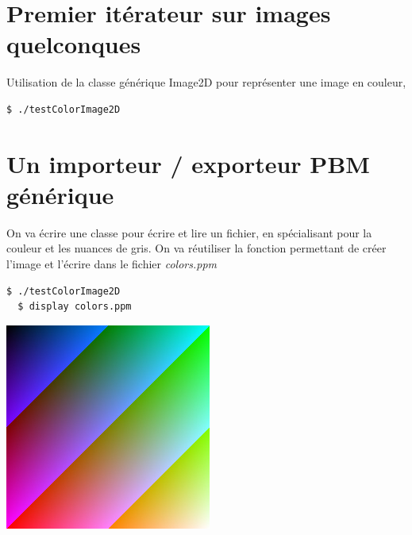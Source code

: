 \documentclass[a4paper,10pt]{article}
\begin{document}
    \section{Premier itérateur sur images quelconques}
     Utilisation de la classe générique Image2D pour représenter une image en couleur,
  \begin{lstlisting}[language=Bash]
  $ ./testColorImage2D
  \end{lstlisting}
    \section{Un importeur / exporteur PBM générique}
    On va écrire une classe pour écrire et lire un fichier, en spécialisant pour la couleur et les nuances de gris. On va réutiliser la fonction permettant de créer l'image et l'écrire dans le fichier  \emph{colors.ppm}
    \begin{lstlisting}[language=Bash]
  $ ./testColorImage2D
  $ display colors.ppm
  \end{lstlisting}
  \begin{center}
    \includegraphics[scale=0.75]{colors}
    \end{center}
    \pagebreak
\end{document}
